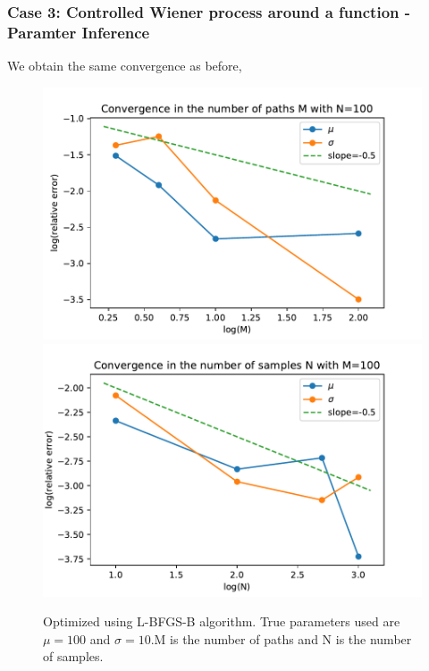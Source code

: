 \documentclass[aspectratio=169]{beamer}\usepackage[utf8]{inputenc}
\begin{document}
\begin{frame}\frametitle{Case 3: Controlled Wiener process around a function - Paramter Inference }
We obtain the same convergence as before,

\begin{figure}
  \includegraphics[scale=0.5]{Figures/conv_M_sine.pdf}
   \includegraphics[scale=0.5]{Figures/conv_N_sine.pdf}
  \caption{ Optimized using L-BFGS-B algorithm. True parameters used are $\mu = 100$ and $\sigma = 10$.M is the number of paths and N is the number of samples.    }
  \label{fig:sine}
\end{figure}

\end{frame}
\end{document}
